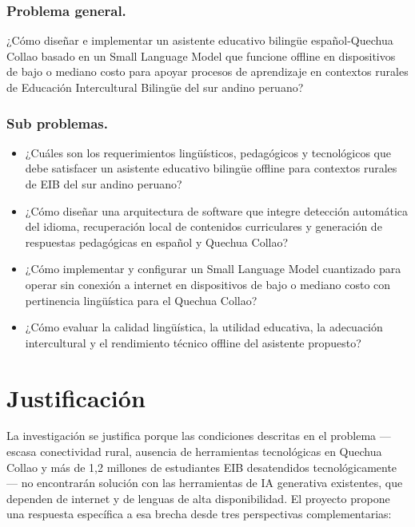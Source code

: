 \subsubsection{Problema general.}
¿Cómo diseñar e implementar un asistente educativo bilingüe español-Quechua Collao basado en un Small Language Model que funcione offline en dispositivos de bajo o mediano costo para apoyar procesos de aprendizaje en contextos rurales de Educación Intercultural Bilingüe del sur andino peruano?

\subsubsection{Sub problemas.}
\begin{itemize}
	\item ¿Cuáles son los requerimientos lingüísticos, pedagógicos y tecnológicos que debe satisfacer un asistente educativo bilingüe offline para contextos rurales de EIB del sur andino peruano?
	\item ¿Cómo diseñar una arquitectura de software que integre detección automática del idioma, recuperación local de contenidos curriculares y generación de respuestas pedagógicas en español y Quechua Collao?
	\item ¿Cómo implementar y configurar un Small Language Model cuantizado para operar sin conexión a internet en dispositivos de bajo o mediano costo con pertinencia lingüística para el Quechua Collao?
	\item ¿Cómo evaluar la calidad lingüística, la utilidad educativa, la adecuación intercultural y el rendimiento técnico offline del asistente propuesto?
\end{itemize}


\section{Justificación}
La investigación se justifica porque las condiciones descritas en el problema —escasa conectividad rural, ausencia de herramientas tecnológicas en Quechua Collao y más de 1,2 millones de estudiantes EIB desatendidos tecnológicamente \citep{minedu2018}— no encontrarán solución con las herramientas de IA generativa existentes, que dependen de internet y de lenguas de alta disponibilidad. El proyecto propone una respuesta específica a esa brecha desde tres perspectivas complementarias:

